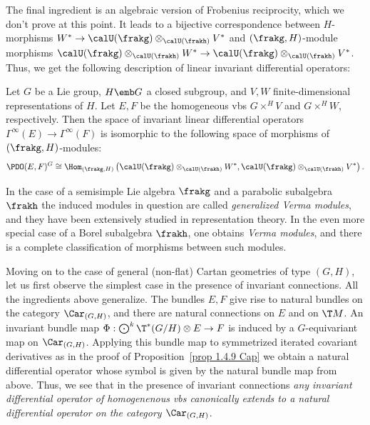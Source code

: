 The final ingredient is an algebraic version of Frobenius reciprocity, which we don't prove at this point. It leads to a bijective correspondence between $H$-morphisms $W^\ast\to \calU(\frakg)\otimes_{\calU(\frakh)}V^\ast$ and $(\frakg,H)$-module morphisms $\calU(\frakg)\otimes_{\calU(\frakh)}W^\ast\to \calU(\frakg)\otimes_{\calU(\frakh)}V^\ast$. Thus, we get the following description of linear invariant differential operators:

\begin{thm}\label{thm 1.4.10 Cap}
    Let $G$ be a Lie group, $H\emb G$ a closed subgroup, and $V,W$ finite-dimensional representations of $H$. Let $E,F$ be the homogeneous \glspl{vb} $G\times^H V$  and $G\times^H W$, respectively. Then the space of invariant linear differential operators $\Gamma^\infty(E)\to \Gamma^\infty(F)$ is isomorphic to the following space of morphisms of $(\frakg,H)$-modules:
    \[\PDO(E,F)^G\cong \Hom_{(\frakg,H)}\left(\calU(\frakg)\otimes_{\calU(\frakh)}W^\ast,\calU(\frakg)\otimes_{\calU(\frakh)}V^\ast\right).\] 
\end{thm}

In the case of a semisimple Lie algebra $\frakg$ and a parabolic subalgebra $\frakh$ the induced modules in question are called \emph{generalized Verma modules}, and they have been extensively studied in representation theory. In the even more special case of a Borel subalgebra $\frakh$, one obtains \emph{Verma modules}, and there is a complete classification of morphisms between such modules.


Moving on to the case of general (non-flat) Cartan geometries of type $(G,H)$, let us first observe the simplest case in the presence of invariant connections. All the ingredients above generalize. The bundles $E,F$ give rise to natural bundles on the category $\Car_{(G,H)}$, and there are natural connections on $E$ and on $\T M$. An invariant bundle map $\Phi:\bigodot\nolimits^k \T^\ast(G\slash H)\otimes E\to F$ is induced by a $G$-equivariant map on $\Car_{(G,H)}$. Applying this bundle map to symmetrized iterated covariant derivatives as in the proof of Proposition~\ref{prop 1.4.9 Cap} we obtain a natural differential operator whose symbol is given by the natural bundle map from above. Thus, we see that in the presence of invariant connections \emph{any invariant differential operator of homogenenous \glspl{vb} canonically extends to a natural differential operator on the category $\Car_{(G,H)}$}.

